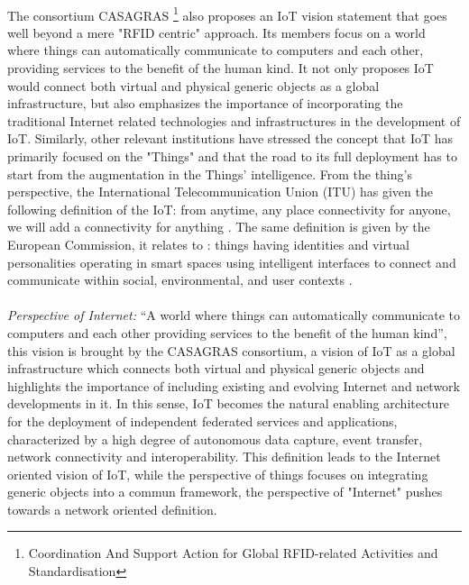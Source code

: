\documentclass[10pt, twocolumn]{article}
\begin{document}
\paragraph{}
The consortium CASAGRAS \footnote{Coordination And Support Action for Global RFID-related Activities and Standardisation} also proposes an IoT vision statement that goes well beyond a mere "RFID centric" approach. Its members focus on a world where things can automatically communicate to computers and each other, providing services to the benefit of the human kind. It not only proposes IoT would connect both virtual and physical generic objects as a global infrastructure, but also emphasizes the importance of incorporating the traditional Internet related technologies and infrastructures in the development of IoT.
Similarly, other relevant institutions have stressed the concept that IoT has primarily focused on the "Things" and that
the road to its full deployment has to start from the augmentation in the Things’ intelligence.
From the thing's perspective, the International Telecommunication Union (ITU) has given the following definition of the IoT: from anytime, any place connectivity for anyone, we will add a connectivity for anything . The same definition is given by the European Commission, it relates to : things having identities and virtual personalities operating in smart spaces using intelligent interfaces to connect and communicate within social, environmental, and user contexts \cite{ref7}.
\paragraph{}
\emph{Perspective of Internet: }
``A world where things can automatically communicate to computers and each other providing services to the benefit of the human kind'', this vision is brought by the CASAGRAS consortium, a vision of IoT as a global infrastructure which connects both virtual and physical generic objects and highlights the importance of including existing and evolving Internet and network developments in it. In this sense, IoT becomes the natural enabling architecture for the deployment of independent federated services and applications, characterized by a high degree of autonomous data capture, event transfer, network connectivity and interoperability. This definition leads to the Internet oriented vision of IoT, while the perspective of things focuses on integrating generic objects into a commun framework, the perspective of "Internet" pushes towards a network oriented definition. 
\end{document}

